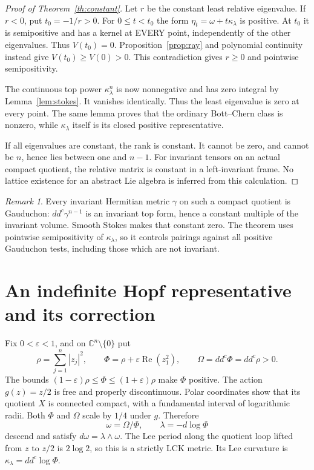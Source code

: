 \documentclass[11pt]{article}
\newcommand{\ddc}{dd^c}
\newcommand{\kap}{\kappa_\lambda}
\theoremstyle{remark}\newtheorem{remark}[theorem]{Remark}
\begin{document}
\begin{proof}[Proof of Theorem~\ref{th:constant}]
Let $r$ be the constant least relative eigenvalue. If $r<0$, put
$t_0=-1/r>0$. For $0\leq t<t_0$ the form
$\eta_t=\omega+t\kap$ is positive. At $t_0$ it is semipositive
and has a kernel at EVERY point, independently of the other
eigenvalues. Thus $V(t_0)=0$. Proposition~\ref{prop:ray} and
polynomial continuity instead give $V(t_0)\geq V(0)>0$.
This contradiction gives $r\geq0$ and pointwise semipositivity.

The continuous top power $\kap^n$ is now nonnegative and has zero
integral by Lemma~\ref{lem:stokes}. It vanishes identically. Thus
the least eigenvalue is zero at every point. The same lemma proves
that the ordinary Bott--Chern class is nonzero, while $\kap$ itself
is its closed positive representative.

If all eigenvalues are constant, the rank is constant. It cannot
be zero, and cannot be $n$, hence lies between one and $n-1$.
For invariant tensors on an actual compact quotient, the relative
matrix is constant in a left-invariant frame. No lattice existence
for an abstract Lie algebra is inferred from this calculation.
\end{proof}

\begin{remark}
Every invariant Hermitian metric $\gamma$ on such a compact quotient
is Gauduchon: $\ddc\gamma^{n-1}$ is an invariant top form, hence a
constant multiple of the invariant volume. Smooth Stokes makes
that constant zero. The theorem uses pointwise semipositivity of
$\kap$, so it controls pairings against all positive Gauduchon
tests, including those which are not invariant.
\end{remark}

\section{An indefinite Hopf representative and its correction}
Fix $0<\varepsilon<1$, and on $\mathbb C^n\setminus\{0\}$ put
\[
 \rho=\sum_{j=1}^n|z_j|^2,\qquad
 \Phi=\rho+\varepsilon\operatorname{Re}(z_1^2),\qquad
 \Omega=\ddc\Phi=\ddc\rho>0.
\]
The bounds $(1-\varepsilon)\rho\leq\Phi\leq(1+\varepsilon)\rho$
make $\Phi$ positive. The action $g(z)=z/2$ is free and properly
discontinuous. Polar coordinates show that its quotient $X$ is
connected compact, with a fundamental interval of logarithmic radii.
Both $\Phi$ and $\Omega$ scale by $1/4$ under $g$. Therefore
\[
 \omega=\Omega/\Phi,\qquad \lambda=-d\log\Phi
\]
descend and satisfy $d\omega=\lambda\wedge\omega$. The Lee period
along the quotient loop lifted from $z$ to $z/2$ is $2\log2$, so this
is a strictly LCK metric. Its Lee curvature is $\kap=\ddc\log\Phi$.
\end{document}
